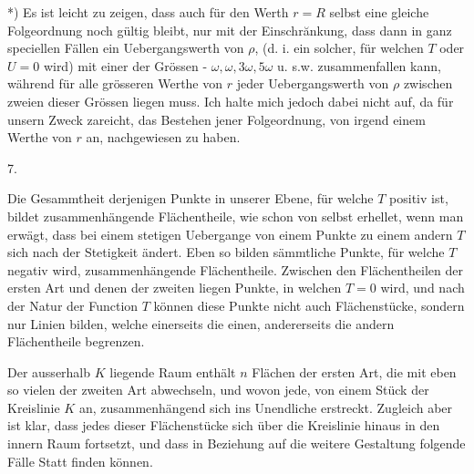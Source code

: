 \documentclass[twoside,12pt, showframe]{memoir}
\begin{document}
*) Es ist leicht zu zeigen, dass auch für den Werth \(r=R\) selbst eine gleiche Folgeordnung noch gültig bleibt, nur mit der Einschrănkung, dass dann in ganz speciellen Fällen ein Uebergangswerth von \(\rho\), (d. i. ein solcher, für welchen \(T\) oder \(U=0\) wird) mit einer der Grössen - \(\omega, \omega, 3 \omega, 5 \omega\) u. s.w. zusammenfallen kann, während für alle grösseren Werthe von \(r\) jeder Uebergangswerth von \(\rho\) zwischen zweien dieser Grössen liegen muss. Ich halte mich jedoch dabei nicht auf, da für unsern Zweck zareicht, das Bestehen jener Folgeordnung, von irgend einem Werthe von \(r\) an, nachgewiesen zu haben.

7.

Die Gesammtheit derjenigen Punkte in unserer Ebene, für welche \(T\) positiv ist, bildet zusammenhängende Flächentheile, wie schon von selbst erhellet, wenn man erwägt, dass bei einem stetigen Uebergange von einem Punkte zu einem andern \(T\) sich nach der Stetigkeit ändert. Eben so bilden sämmtliche Punkte, für welche \(T\) negativ wird, zusammenhängende Flächentheile. Zwischen den Flächentheilen der ersten Art und denen der zweiten liegen Punkte, in welchen \(T=0\) wird, und nach der Natur der Function \(T\) können diese Punkte nicht auch Flächenstücke, sondern nur Linien bilden, welche einerseits die einen, andererseits die andern Flächentheile begrenzen.

Der ausserhalb \(K\) liegende Raum enthält \(n\) Flächen der ersten Art, die mit eben so vielen der zweiten Art abwechseln, und wovon jede, von einem Stück der Kreislinie \(K\) an, zusammenhängend sich ins Unendliche erstreckt. Zugleich aber ist klar, dass jedes dieser Flächenstücke sich über die Kreislinie hinaus in den innern Raum fortsetzt, und dass in Beziehung auf die weitere Gestaltung folgende Fälle Statt finden können.
\end{document}

